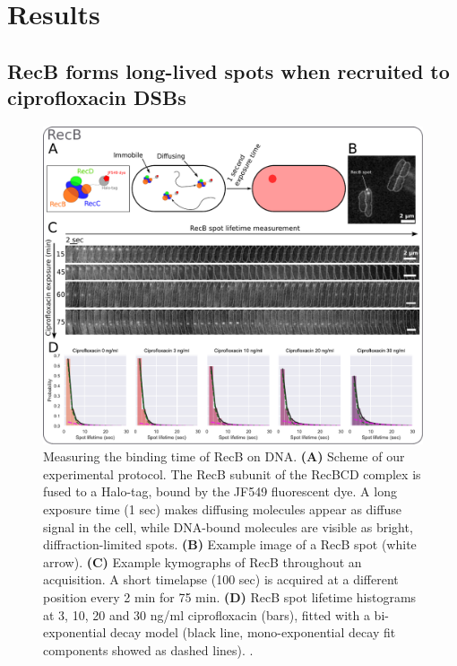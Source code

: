 \section*{Results}

\subsection*{RecB forms long-lived spots when recruited to cipro\-floxacin DSBs}

\begin{figure}[htbp]
    \centering
    \includegraphics[width=.8\textwidth]{Figures/Fig1_RecB_lifetime.pdf}
    \caption{Measuring the binding time of RecB on DNA. \textbf{(A)} Scheme of our experimental protocol. The RecB subunit of the RecBCD complex is fused to a Halo-tag, bound by the JF549 fluorescent dye. A long exposure time (1 sec) makes diffusing molecules appear as diffuse signal in the cell, while DNA-bound molecules are visible as bright, diffraction-limited spots. \textbf{(B)} Example image of a RecB spot (white arrow). \textbf{(C)} Example kymographs of RecB throughout an acquisition. A short timelapse (100 sec) is acquired at a different position every 2 min for 75 min. \textbf{(D)} RecB spot lifetime histograms at 3, 10, 20 and 30 ng/ml ciprofloxacin (bars), fitted with a bi-exponential decay model (black line, mono-exponential decay fit components showed as dashed lines). . }
    \label{Fig:lifetimes}
\end{figure}

